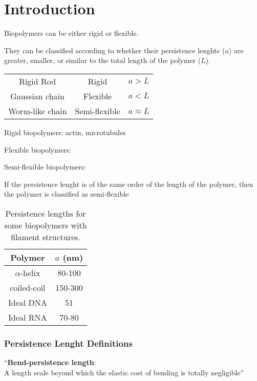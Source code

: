 \part{Introduction}
Biopolymers can be either rigid or flexible. 

They can be classified  according to whether their persistence lenghts ($a$)
are greater, smaller, or similar to the total length of the polymer ($L$).

\begin{table}[htbp]
\begin{center}  
\begin{tabular}{c|c|c}
\hline
Rigid Rod       & Rigid          &        $a > L$   \\
Gaussian chain  & Flexible       &        $a < L$   \\
Worm-like chain & Semi-flexible  &    $a \approx L$ \\
\hline
\end{tabular}
\end{center}
\end{table}

Rigid biopolymers:
actin, microtubules

Flexible biopolymers:

Semi-flexible biopolymers:

If the persistence lenght is of the same order of the length of the
polymer, then the polymer is classified as  semi-flexible


\begin{table}[htbp]
\begin{center}  
\begin{tabular}{c|c}
\hline
Polymer       & $a$ (nm)   \\ \hline
$\alpha$-helix & 80-100\\
coiled-coil & 150-300\\
Ideal DNA  &  51  \\
Ideal RNA & 70-80 \\
\hline
\end{tabular}
\caption{Persistence lengths for some biopolymers with filament structures.}
\end{center}
\end{table}


\section{Persistence Lenght Definitions}

``\textbf{Bend-persistence length}:\\ 
A length scale beyond which the elastic cost of bending is totally
negligible''

